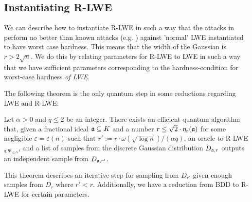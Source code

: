\subsection{Instantiating R-LWE}
     We can describe how to instantiate R-LWE in such a way that the attacks in \cite{How Not To RLWE} perform no better than known attacks (e.g. \cite{LWE Attack 1, LWE Attack 2}) against 'normal' LWE instantiated to have worst case hardness. This means that the width of the Gaussian is \(r>2\sqrt{n}\). We do this by relating parameters for R-LWE to LWE in such a way that we have sufficient parameters corresponding to the hardness-condition for worst-case hardness \emph{of LWE}. \par
     
     The following theorem is the only quantum step in some reductions regarding LWE and R-LWE:
     \begin{theorem}
        Let \(\alpha > 0\) and \(q\leq 2\) be an integer. There exists an efficient quantum algorithm that, given a fractional ideal \(\mathfrak{a}\subseteq K\) and a number \(r\leq\sqrt{2}\cdot\eta_{\varepsilon}(\mathfrak{a})\) for some negligible \(\varepsilon = \varepsilon(n)\) such that \(r' := r\cdot\omega(\sqrt{\log n})/(\alpha q)\), an oracle to R-LWE\(_{q, \Psi_{\leq\alpha}}\), and a list of samples from the discrete Gaussian distribution \(D_{\mathfrak{a}, r}\) outputs an independent sample from \(D_{\mathfrak{a}, r'}\).
     \end{theorem}
     This theorem describes an iterative step for sampling from \(D_{r'}\) given enough samples from \(D_{r}\) where \(r' < r\). Additionally, we have a reduction from BDD to R-LWE for certain parameters. 
